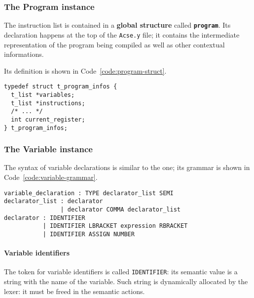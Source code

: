 \documentclass[english]{article}
\begin{document}
\subsubsection{The Program instance}

The instruction list is contained in a \textbf{global structure} called \textbf{\texttt{program}}.
Its declaration happens at the top of the \texttt{Acse.y} file;
it contains the intermediate representation of the program being compiled as well as other contextual informations.

Its definition is shown in Code~\ref{code:program-struct}.

\begin{onepage}
  \begin{lstlisting}[language=LANCE, caption={\texttt{program} structure}, label={code:program-struct}]
typedef struct t_program_infos {
  t_list *variables;
  t_list *instructions;
  /* ... */
  int current_register;
} t_program_infos;
\end{lstlisting}
\end{onepage}

\subsubsection{The Variable instance}

The syntax of variable declarations is similar to the \clang one; its grammar is shown in Code~\ref{code:variable-grammar}.

\begin{onepage}
  \begin{lstlisting}[language=LANCE, caption={Variable grammar}, label={code:variable-grammar}]
variable_declaration : TYPE declarator_list SEMI
declarator_list : declarator
                | declarator COMMA declarator_list
declarator : IDENTIFIER
           | IDENTIFIER LBRACKET expression RBRACKET
           | IDENTIFIER ASSIGN NUMBER
\end{lstlisting}
\end{onepage}

\paragraph*{Variable identifiers}

The token for variable identifiers is called \texttt{IDENTIFIER}:
its semantic value is a \clang string with the name of the variable.
Such string is dynamically allocated by the lexer: it must be freed in the semantic actions.
\end{document}
